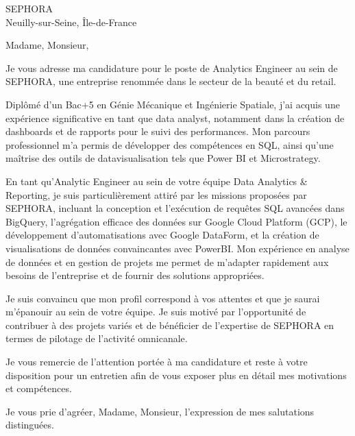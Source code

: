 \documentclass[a4paper,10pt]{letter}
\begin{document}
\begin{letter}{SEPHORA\\ Neuilly-sur-Seine, Île-de-France}

\opening{Madame, Monsieur,}

Je vous adresse ma candidature pour le poste de Analytics Engineer au sein de SEPHORA, une entreprise renommée dans le secteur de la beauté et du retail. 

Diplômé d'un Bac+5 en Génie Mécanique et Ingénierie Spatiale, j'ai acquis une expérience significative en tant que data analyst, notamment dans la création de dashboards et de rapports pour le suivi des performances. Mon parcours professionnel m'a permis de développer des compétences en SQL, ainsi qu'une maîtrise des outils de datavisualisation tels que Power BI et Microstrategy.

En tant qu'Analytic Engineer au sein de votre équipe Data Analytics & Reporting, je suis particulièrement attiré par les missions proposées par SEPHORA, incluant la conception et l'exécution de requêtes SQL avancées dans BigQuery, l'agrégation efficace des données sur Google Cloud Platform (GCP), le développement d'automatisations avec Google DataForm, et la création de visualisations de données convaincantes avec PowerBI. Mon expérience en analyse de données et en gestion de projets me permet de m'adapter rapidement aux besoins de l'entreprise et de fournir des solutions appropriées.

Je suis convaincu que mon profil correspond à vos attentes et que je saurai m'épanouir au sein de votre équipe. Je suis motivé par l'opportunité de contribuer à des projets variés et de bénéficier de l'expertise de SEPHORA en termes de pilotage de l'activité omnicanale.

Je vous remercie de l'attention portée à ma candidature et reste à votre disposition pour un entretien afin de vous exposer plus en détail mes motivations et compétences.

\closing{Je vous prie d'agréer, Madame, Monsieur, l'expression de mes salutations distinguées.}

\signature{Pietro Gazzi}

\end{letter}
\end{document}
